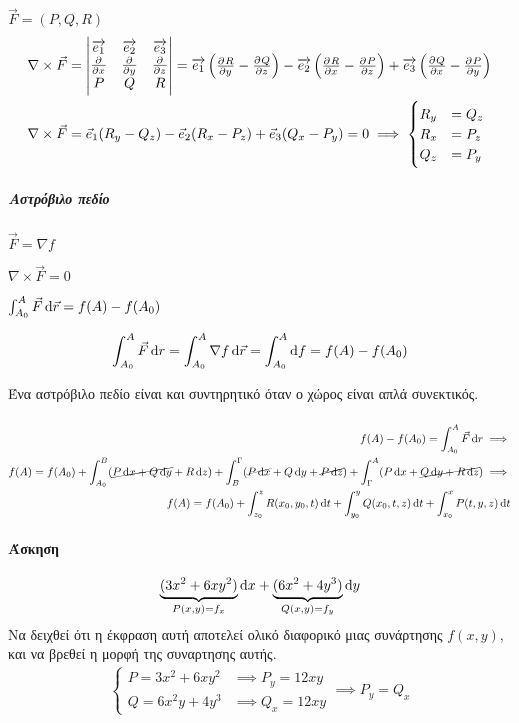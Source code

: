 \documentclass[11pt,a4paper,titlepage,draft]{article}
\begin{document}
\(\vec F = (P,Q,R)\)
\begin{align*}
\nabla \times \vec F &= \left|
\begin{matrix}
\overrightarrow{e_1}&\overrightarrow{e_2}&\overrightarrow{e_3}\\
\pd{}{x}&\pd{}{y}&\pd{}{z}\\
P&Q&R
\end{matrix}
\right|
=
\overrightarrow{e_1}\left(
\pd{R}{y}-\pd{Q}{z}
\right)
-
\overrightarrow{e_2}\left(
\pd{R}{x}-\pd{P}{z}
\right)
+
\overrightarrow{e_3}\left(
\pd{Q}{x}-\pd{P}{y}
\right)\\
\nabla \times \vec F &= \vec e_1 (R_y-Q_z) - \vec e_2 (R_x-P_z) + \vec e_3 (Q_x-P_y) = 0 \implies
\begin{cases}
R_y&=Q_z\\
R_x&=P_z\\
Q_z&=P_y
\end{cases}
\end{align*}

\subparagraph{Αστρόβιλο πεδίο}
\begin{enumparen}
\item \(\vec F = \nabla f\)
\item \(\nabla \times \vec F = 0\)
\item \( \int_{A_0}^A \vec F\dif\vec r = f(A)-f(A_0)\)
\end{enumparen}

\[
\int_{A_0}^A \vec F \dif r = \int_{A_0}^A \nabla f \dif \vec r = \int_{A_0}^A \dif f = f(A)-f(A_0)
\]

Ένα αστρόβιλο πεδίο είναι και συντηρητικό όταν ο χώρος είναι απλά συνεκτικός.

\paragraph{}
\begin{align*}
f(A)-f(A_0)=
\int_{A_0}^A \vec F \dif r \implies \\ f(A)=f(A_0)+\int_{A_0}^B (\cancel{P\dif x+Q\dif y} + R\dif z) +
\int_B^\Gamma (\cancel{P\dif x}+Q\dif y +\cancel{P\dif z}) + \int_\Gamma^A (P\dif x + \cancel{Q\dif y+R\dif z})
\implies \\
f(A)=f(A_0)+\int_{z_0}^z R(x_0,y_0,t)\dif t + \int_{y_0}^y Q(x_0,t,z)\dif t +\int_{x_0}^x P(t,y,z)\dif t
\end{align*}

\paragraph{Άσκηση}
\[
\underbrace{(3x^2+6xy^2)}_{P(x,y)=f_x}\dif x + \underbrace{(6x^2+4y^3)}_{Q(x,y)=f_y}\dif y
\]
Να δειχθεί ότι η έκφραση αυτή αποτελεί ολικό διαφορικό μιας συνάρτησης \(f(x,y)\), και να βρεθεί η μορφή της συναρτησης αυτής.
\begin{align*}
\begin{cases}
P=3x^2+6xy^2 &\implies P_y = 12xy\\
Q=6x^2y+4y^3 &\implies Q_x=12xy
\end{cases}
\implies P_y=Q_x
\end{align*}
\end{document}
